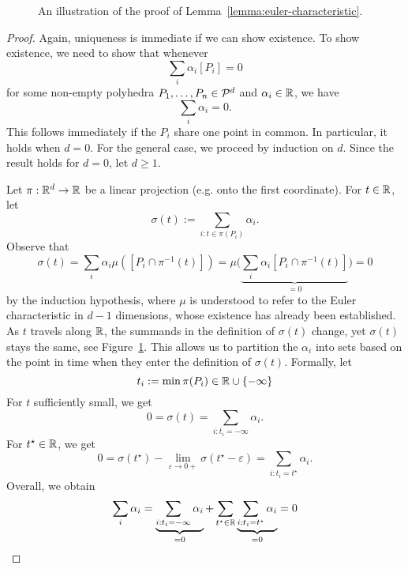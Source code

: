 \begin{figure}
  \begin{center}
  \end{center}
  \caption{An illustration of the proof of Lemma~\ref{lemma:euler-characteristic}.}
  \label{fig:proof-euler-characteristic}
\end{figure}
\begin{proof}
  Again, uniqueness is immediate if we can show existence.
  To show existence, we need to show that whenever
  \[
    \sum_i \alpha_i [P_i] = 0
  \]
  for some non-empty polyhedra $P_1, \ldots, P_n \in \mathcal{P}^d$ and $\alpha_i \in \mathbb{R}$,
  we have
  \[
    \sum_i \alpha_i = 0.
  \]
  This follows immediately if the $P_i$ share one point in common.
  In particular, it holds when $d = 0$.
  For the general case, we proceed by induction on $d$.
  Since the result holds for $d = 0$, let $d \geq 1$.

  Let $\pi : \mathbb{R}^d \to \mathbb{R}$ be a linear projection (e.g. onto the first coordinate).
  For $t \in \mathbb{R}$, let
  \[
    \sigma(t) := \sum_{i : t \in \pi(P_i)} \alpha_i.
  \]
  Observe that
  \[
    \sigma(t) = \sum_i \alpha_i \mu([P_i \cap \pi^{-1}(t)])
      = \mu\big( \underbrace{\sum_i \alpha_i [P_i \cap \pi^{-1}(t)]}_{=0} \big)
      = 0
  \]
  by the induction hypothesis,
  where $\mu$ is understood to refer to the Euler characteristic in $d-1$ dimensions,
  whose existence has already been established.
  As $t$ travels along $\mathbb{R}$,
  the summands in the definition of $\sigma(t)$ change,
  yet $\sigma(t)$ stays the same, see Figure~\ref{fig:proof-euler-characteristic}.
  This allows us to partition the $\alpha_i$ into sets based on the point in time when they enter the definition of $\sigma(t)$.
  Formally, let
  \[
     t_i := \min\pi(P_i) \in \mathbb{R} \cup \{ -\infty \}
  \]
  For $t$ sufficiently small,
  we get
  \[
    0 = \sigma(t) = \sum_{i : t_i = -\infty} \alpha_i.
  \]
  For $t^\star \in \mathbb{R}$, we get
  \[
    0 = \sigma(t^\star) - \lim_{\varepsilon \to 0+} \sigma(t^\star - \varepsilon) = \sum_{i: t_i = t^\star} \alpha_i.
  \]
  Overall, we obtain
  \[
    \sum_i \alpha_i = \underbrace{\sum_{i : t_i = -\infty} \alpha_i}_{=0} + \sum_{t^\star \in \mathbb{R}} \underbrace{\sum_{i: t_i = t^\star} \alpha_i}_{=0} = 0 \qedhere
  \]
\end{proof}



